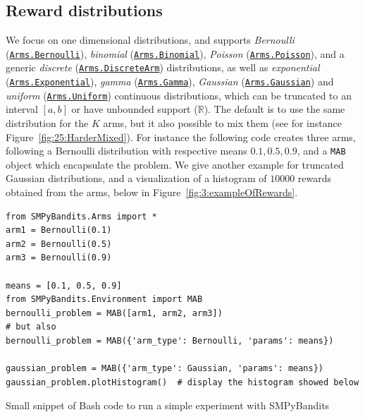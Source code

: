 \subsection{Reward distributions}
%
We focus on one dimensional distributions,
and supports \emph{Bernoulli} (\texttt{\href{https://smpybandits.github.io/docs/Arms.Bernoulli.html}{Arms.Bernoulli}}), \emph{binomial} (\texttt{\href{https://smpybandits.github.io/docs/Arms.Binomial.html}{Arms.Binomial}}), \emph{Poisson} (\texttt{\href{https://smpybandits.github.io/docs/Arms.Poisson.html}{Arms.Poisson}}), and a generic \emph{discrete} (\texttt{\href{https://smpybandits.github.io/docs/Arms.DiscreteArm.html}{Arms.DiscreteArm}}) distributions,
as well as \emph{exponential} (\texttt{\href{https://smpybandits.github.io/docs/Arms.Exponential.html}{Arms.Exponential}}), \emph{gamma} (\texttt{\href{https://smpybandits.github.io/docs/Arms.Gamma.html}{Arms.Gamma}}), \emph{Gaussian} (\texttt{\href{https://smpybandits.github.io/docs/Arms.Gaussian.html}{Arms.Gaussian}}) and \emph{uniform} (\texttt{\href{https://smpybandits.github.io/docs/Arms.Uniform.html}{Arms.Uniform}}) continuous distributions,
which can be truncated to an interval $[a,b]$ or have unbounded support ($\mathbb{R}$).
%
The default is to use the same distribution for the $K$ arms, but it also possible to mix them (see for instance Figure~\ref{fig:25:HarderMixed}).
%
For instance the following code creates three arms, following a Bernoulli distribution with respective means $0.1, 0.5, 0.9$, and a \texttt{MAB} object which encapsulate the problem.
We give another example for truncated Gaussian distributions, and a visualization of a histogram of $10000$ rewards obtained from the arms, below in Figure~\ref{fig:3:exampleOfRewards}.

\begin{small}
\begin{listing}[h!]
    \begin{verbatim}
from SMPyBandits.Arms import *
arm1 = Bernoulli(0.1)
arm2 = Bernoulli(0.5)
arm3 = Bernoulli(0.9)

means = [0.1, 0.5, 0.9]
from SMPyBandits.Environment import MAB
bernoulli_problem = MAB([arm1, arm2, arm3])
# but also
bernoulli_problem = MAB({'arm_type': Bernoulli, 'params': means})

gaussian_problem = MAB({'arm_type': Gaussian, 'params': means})
gaussian_problem.plotHistogram()  # display the histogram showed below
    \end{verbatim}
    \caption{Small snippet of Bash code to run a simple experiment with SMPyBandits}
    \label{lst:3:howToRunBasicLibrary}
\end{listing}
\end{small}

